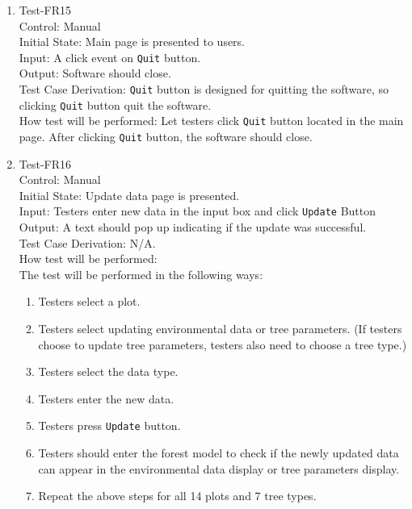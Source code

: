 \documentclass[12pt, titlepage]{article}
\begin{document}
\begin{enumerate}
\item{Test-FR15\\}
Control: Manual\\ 

Initial State: Main page is presented to users.\\

Input: A click event on \verb|Quit| button.\\

Output: Software should close.\\

Test Case Derivation: \verb|Quit| button is designed for quitting the software,
so clicking \verb|Quit| button quit the software.\\
					
How test will be performed:  Let testers click \verb|Quit| button located in the main
page. After clicking \verb|Quit| button, the software should close.

\item{Test-FR16\\}
Control: Manual\\ 

Initial State: Update data page is presented.\\

Input: Testers enter new data in the input box and click \verb|Update| Button\\

Output: A text should pop up indicating if the update was successful.\\

Test Case Derivation: N/A.\\
					
How test will be performed: \\ The test will be performed in the following ways:
\begin{enumerate}[1.]
\item Testers select a plot.
\item Testers select updating environmental data or tree parameters. (If testers
choose to update tree parameters, testers also need to choose a tree type.)
\item Testers select the data type.
\item Testers enter the new data.
\item Testers press \verb|Update| button.
\item Testers should enter the forest model to check if the newly updated data can 
appear in the environmental data display or tree parameters display. 
\item Repeat the above steps for all 14 plots and 7 tree types.
\end{enumerate}


\end{enumerate}
\end{document}
